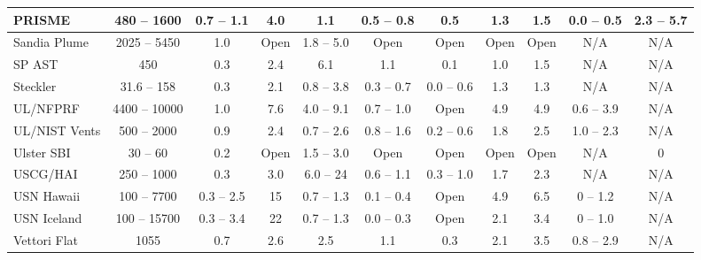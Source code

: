 \begin{landscape}
\begin{longtable}{|l|c|c|c|c|c|c|c|c|c|c|}
PRISME              & 480 -- 1600   & 0.7 -- 1.1    & 4.0   & 1.1               & 0.5 -- 0.8          & 0.5           & 1.3         & 1.5         & 0.0 -- 0.5            & 2.3 -- 5.7            \\ \hline
Sandia Plume        & 2025 -- 5450  & 1.0           & Open  & 1.8 -- 5.0        & Open                & Open          & Open        & Open        & N/A                   & N/A                   \\ \hline
SP AST              & 450           & 0.3           & 2.4   & 6.1               & 1.1                 & 0.1           & 1.0         & 1.5         & N/A                   & N/A                   \\ \hline
Steckler            & 31.6 -- 158   & 0.3           & 2.1   & 0.8 -- 3.8        & 0.3 -- 0.7          & 0.0 -- 0.6    & 1.3         & 1.3         & N/A                   & N/A                   \\ \hline
UL/NFPRF            & 4400 -- 10000 & 1.0           & 7.6   & 4.0 -- 9.1        & 0.7 -- 1.0          & Open          & 4.9         & 4.9         & 0.6 -- 3.9            & N/A                   \\ \hline
UL/NIST Vents       & 500 -- 2000   & 0.9           & 2.4   & 0.7 -- 2.6        & 0.8 -- 1.6          & 0.2 -- 0.6    & 1.8         & 2.5         & 1.0 -- 2.3            & N/A                   \\ \hline
Ulster SBI          & 30 -- 60      & 0.2           & Open  & 1.5 -- 3.0        & Open                & Open          & Open        & Open        & N/A                   & 0                     \\ \hline
USCG/HAI            & 250 -- 1000   & 0.3           & 3.0   & 6.0 -- 24         & 0.6 -- 1.1          & 0.3 -- 1.0    & 1.7         & 2.3         & N/A                   & N/A                   \\ \hline
USN Hawaii          & 100 -- 7700   & 0.3 -- 2.5    & 15    & 0.7 -- 1.3        & 0.1 -- 0.4          & Open          & 4.9         & 6.5         & 0 -- 1.2              & N/A                   \\ \hline
USN Iceland         & 100 -- 15700  & 0.3 -- 3.4    & 22    & 0.7 -- 1.3        & 0.0 -- 0.3          & Open          & 2.1         & 3.4         & 0 -- 1.0              & N/A                   \\ \hline
Vettori Flat        & 1055          & 0.7           & 2.6   & 2.5               & 1.1                 & 0.3           & 2.1         & 3.5         & 0.8 -- 2.9            & N/A                   \\ \hline

\end{longtable}
\end{landscape}
